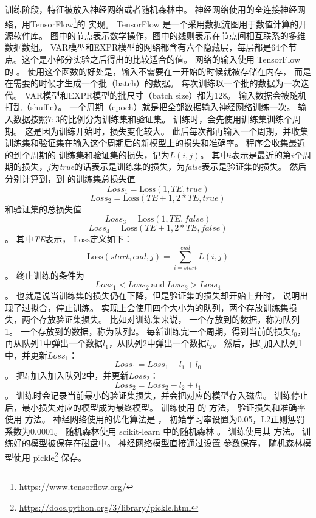训练阶段，特征被放入神经网络或者随机森林中。
神经网络使用的全连接神经网络，用TensorFlow\footnote{\url{https://www.tensorflow.org/}}的  实现。
TensorFlow 是一个采用数据流图用于数值计算的开源软件库。
图中的节点表示数学操作，图中的线则表示在节点间相互联系的多维数据数组。
VAR模型和EXPR模型的网络都含有六个隐藏层，每层都是64个节点。这个是小部分实验之后得出的比较适合的值。
网络的输入使用 TensorFlow 的 。
使用这个函数的好处是，输入不需要在一开始的时候就被存储在内存，
而是在需要的时候才生成一个批（batch）的数据。
每次训练以一个批的数据为一次迭代。
VAR模型和EXPR模型的批尺寸（batch size）都为128。
输入数据会被随机打乱（shuffle）。
一个周期（epoch）就是把全部数据输入神经网络训练一次。
输入数据按照$7:3$的比例分为训练集和验证集。
训练时，会先使用训练集训练个周期。
这是因为训练开始时，损失变化较大。
此后每次都再输入一个周期，并收集训练集和验证集在输入这个周期后的新模型上的损失和准确率。
程序会收集最近的到个周期的
训练集和验证集的损失，记为$L(i, j)$。
其中$i$表示是最近的第$i$个周期的损失，$j$为\textit{true}的话表示是训练集的损失，为\textit{false}表示是验证集的损失。
然后分别计算到，到
的训练集总损失值
$$
Loss_1 = \mathrm{Loss}(1, TE, true)
$$
$$
Loss_2 = \mathrm{Loss}(TE + 1, 2 * TE, true)
$$
和验证集的总损失值
$$
Loss_3 = \mathrm{Loss}(1, TE, false)
$$
$$
Loss_4 = \mathrm{Loss}(TE + 1, 2 * TE, false)
$$。
其中\textit{TE}表示，
$\mathrm{Loss}$定义如下：
$$
\mathrm{Loss}(start, end, j) = \sum_{i=start}^{end}{L(i, j)}
$$。
终止训练的条件为
$$
Loss_1 < Loss_2 \ \mathrm{and} \ Loss_3 > Loss_4
$$。
也就是说当训练集的损失仍在下降，但是验证集的损失却开始上升时，
说明出现了过拟合，停止训练。
实现上会使用四个大小为的队列，两个存放训练集损失，两个存放验证集损失。
比如对训练集来说，
一个存放到的数据，称为队列1。
一个存放到的数据，称为队列2。
每新训练完一个周期，得到当前的损失$l_0$，
再从队列1中弹出一个数据$l_1$，从队列2中弹出一个数据$l_2$。
然后，把$l_0$加入队列1中，并更新$Loss_1$：
$$
Loss_1 = Loss_1 - l_1 + l_0
$$。
把$l_1$加入加入队列2中，并更新$Loss_2$：
$$
Loss_2 = Loss_2 - l_2 + l_1
$$。
训练时会记录当前最小的验证集损失，并会把对应的模型存入磁盘。
训练停止后，最小损失对应的模型成为最终模型。
训练使用  的  方法，
验证损失和准确率使用  方法。
神经网络使用的优化算法是 ，
初始学习率设置为0.05，L2正则惩罚系数为0.0001。
随机森林使用 scikit-learn 中的随机森林  。
训练使用其  方法。
训练好的模型被保存在磁盘中。
神经网络模型直接通过设置  参数保存，
随机森林模型使用 pickle\footnote{\url{https://docs.python.org/3/library/pickle.html}} 保存。

